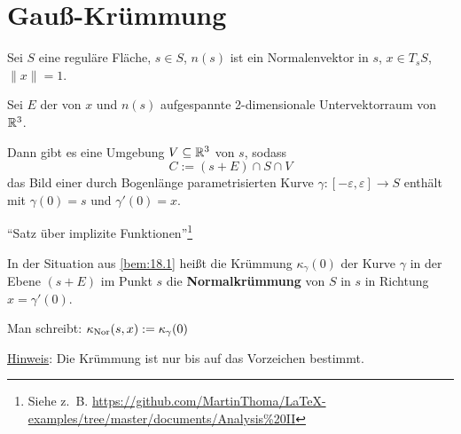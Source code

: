 \section{Gauß-Krümmung}
\begin{bemerkung}\label{bem:18.1}%
    Sei $S$ eine reguläre Fläche, $s \in S$, $n(s)$ ist ein Normalenvektor
    in $s$, $x \in T_s S$, $\|x\| = 1$.

    Sei $E$ der von $x$ und $n(s)$ aufgespannte 2-dimensionale 
    Untervektorraum von $\mathbb{R}^3$.

    Dann gibt es eine Umgebung $V \subseteq \mathbb{R}^3$ von $s$, sodass
    \[C := (s + E) \cap S \cap V\]
    das Bild einer durch Bogenlänge parametrisierten Kurve
    $\gamma:[-\varepsilon, \varepsilon] \rightarrow S$ enthält mit
    $\gamma(0) = s$ und $\gamma'(0) = x$.
\end{bemerkung}

\begin{beweis}
    \enquote{Satz über implizite Funktionen}\footnote{Siehe z.~B. 
    \url{https://github.com/MartinThoma/LaTeX-examples/tree/master/documents/Analysis\%20II}}
\end{beweis}

\begin{definition}%
    In der Situation aus \cref{bem:18.1} heißt die Krümmung $\kappa_\gamma(0)$
    der Kurve $\gamma$ in der Ebene $(s+ E)$ im Punkt $s$ die
    \textbf{Normalkrümmung} von $S$ in $s$ in Richtung
    $x = \gamma'(0)$.

    Man schreibt: $\kappa_{\textnormal{Nor}}(s, x) := \kappa_\gamma(0)$
\end{definition}

\underline{Hinweis}: Die Krümmung ist nur bis auf das Vorzeichen bestimmt.

